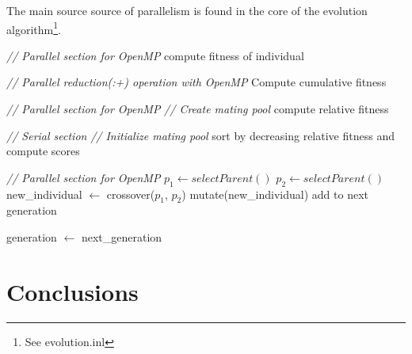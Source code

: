 \documentclass{acm_proc_article-sp}
\begin{document}
The main source source of parallelism is found in the core of the evolution algorithm\footnote{See evolution.inl}.
\begin{algorithm}
\begin{algorithmic}[1]
        \State

        \State \textit{\small{// Parallel section for OpenMP}}
            \State compute fitness of individual
        \EndFor

        \State

        \State \textit{\small{// Parallel reduction(:+) operation with OpenMP}}
        \State Compute cumulative fitness

        \State

        \State \textit{\small{// Parallel section for OpenMP}}
        \State \textit{\small{// Create mating pool}}
            \State compute relative fitness
        \EndFor

        \State

        \State \textit{\small{// Serial section}}
        \State \textit{\small{// Initialize mating pool}}
        \State sort by decreasing relative fitness and compute scores

        \State

        \State \textit{\small{// Parallel section for OpenMP}}
       		\State $p_1 \gets selectParent()$
       		\State $p_2 \gets selectParent()$
            \State new\_individual $\gets$ crossover($p_1$, $p_2$)
            \State mutate(new\_individual)
            \State add to next generation
        \EndFor

        \State

        \State generation $\gets$ next\_generation

        \State
    \EndFor
\end{algorithmic}
\end{algorithm}



\section{Conclusions}




%

%
%
\end{document}

